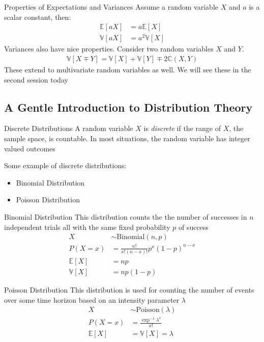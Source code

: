 \documentclass{beamer}
\begin{document}
\begin{frame}{Properties of Expectations and Variances}
Assume a random variable $X$ and $a$ is a scalar constant, then:
\begin{align*}
\mathbb{E}[aX] &= a \mathbb{E}[X] \\
\mathbb{V}[aX] &= a^{2} \mathbb{V}[X]
\end{align*}
Variances also have nice properties. Consider two random variables $X$ and $Y$.
\begin{align*}
\mathbb{V}[X \mp Y] = \mathbb{V}[X] + \mathbb{V}[Y] \mp 2\mathbb{C}(X,Y)
\end{align*}
These extend to multivariate random variables as well. We will see these in the second session today
\end{frame}

\subsection{A Gentle Introduction to Distribution Theory}

\begin{frame}{Discrete Distributions}
A random variable $X$ is \emph{discrete} if the range of $X$, the sample space, is countable. In most situations, the random variable has integer valued outcomes
\newline

Some example of discrete distributions:
\begin{itemize}
\item{Binomial Distribution}
\item{Poisson Distribution}
\end{itemize}
\end{frame}


\begin{frame}{Binomial Distribution}
This distribution counts the the number of successes in $n$ independent trials all with the same fixed probability $p$ of success
\begin{align*}
X &\sim \mathrm{Binomial}(n, p) \\
P(X  = x) &= \frac{n!}{x!(n-x)!} p^{x}(1-p)^{n-x} \\
\mathbb{E}[X] &= np \\
\mathbb{V}[X] &= n p (1-p)
\end{align*}
\end{frame}

\begin{frame}{Poisson Distribution}
This distribution is used for counting the number of events over some time horizon based on an intensity parameter $\lambda$
\begin{align*}
X &\sim \mathrm{Poisson}(\lambda)\\
P(X = x) &= \frac{\exp^{-\lambda}\lambda^{x}}{x!}\\
\mathbb{E}[X] &= \mathbb{V}[X] = \lambda
\end{align*}
\end{frame}
\end{document}

